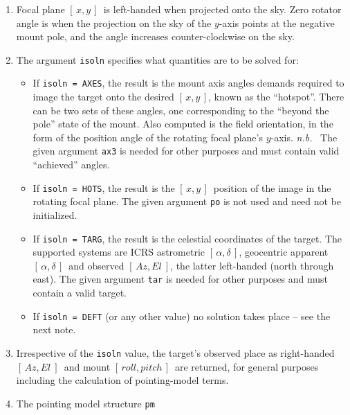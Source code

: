 \documentclass[11pt,fleqn,twoside,\paper]{article}
\renewcommand{\_}{{\tt\char'137}}     %
\newcommand{\radec}     {$[\,\alpha,\delta\,]$}
\newcommand{\azel}      {$[\,Az,El~]$}
\newcommand{\ropi}      {$[\,roll,pitch\,]$}
\newcommand{\xy}        {$[\,x,y\,]$}
\begin{document}
{\begin{enumerate}
      Thus a telescope can track a star by knowing the \radec\ and the
      desired image \xy, and repeatedly solving for mount angles as the
      astronomical transformations progress.  Or the mapping between
      sky coordinates and focal plane coordinates can be sampled, in
      both directions.
\item Focal plane \xy\ is left-handed when projected onto the sky.
      Zero rotator angle is when the projection on the sky of the
      $y$-axis points at the negative mount pole, and the angle
      increases counter-clockwise on the sky.
\item The argument {\tt isoln} specifies what quantities are to be
      solved for:
      \begin{itemize}
      \item If {\tt isoln = AXES}, the result is the mount axis
            angles demands required to image the target onto the desired
            \xy, known as the ``hotspot''.  There can be two sets of
            these angles, one corresponding to the ``beyond the pole''
            state of the mount.  Also computed is the field orientation,
            in the form of the position angle of the rotating focal
            plane's $y$-axis.  {\it n.b.}~ The given argument {\tt ax3}
            is needed for other purposes and must contain valid
            ``achieved'' angles.
      \item If {\tt isoln = HOTS}, the result is the \xy\ position
            of the image in the rotating focal plane.  The given
            argument {\tt po} is not used and need not be
            initialized.
      \item If {\tt isoln = TARG}, the result is the celestial
            coordinates of the target.  The supported systems are
            ICRS astrometric \radec, geocentric apparent \radec\
            and observed \azel, the latter left-handed (north
            through east).  The given argument {\tt tar} is
            needed for other purposes and must contain a valid
            target.
      \item If {\tt isoln = DEFT} (or any other value) no solution
            takes place -- see the next note.
      \end{itemize}
\item Irrespective of the {\tt isoln} value, the target's observed place
      as right-handed \azel\ and mount \ropi\ are returned, for
      general purposes including the calculation of pointing-model
      terms.
\item The pointing model structure {\tt pm}

\end{enumerate}}
\end{document}
